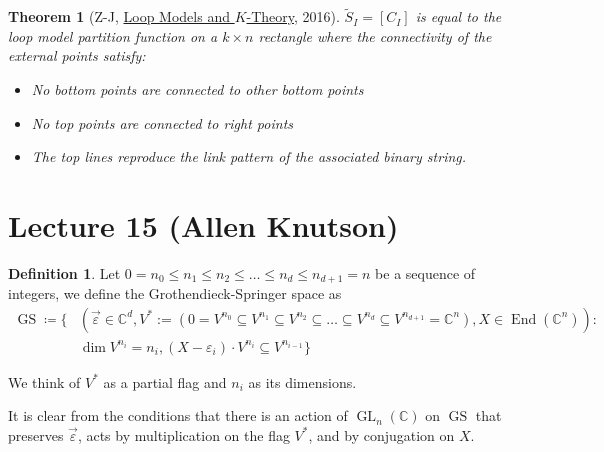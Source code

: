 \documentclass[12pt]{amsart}
\numberwithin{equation}{section}
\newtheorem{Theorem}[equation]{Theorem}
\theoremstyle{definition}
\newtheorem{Definition}[equation]{Definition}
\numberwithin{figure}{section}
\newcommand{\C}{\mathbb{C}}
\newcommand{\GL}{\operatorname{GL}}
\newcommand{\End}{\operatorname{End}}
\newcommand{\Stil}{\tilde{S}}
\newcommand{\GS}{\operatorname{GS}}
\begin{document}
\begin{Theorem}[Z-J, \href{https://doi.org/10.3842/SIGMA.2018.069}{Loop Models and $K$-Theory}, 2016]
	$\Stil_I = [C_I]$ is equal to the loop model partition function on a $k \times n$ rectangle where the connectivity of the external points satisfy:
	\begin{itemize}
		\item No bottom points are connected to other bottom points
		\item No top points are connected to right points
		\item The top lines reproduce the link pattern of the associated binary string.
	\end{itemize}
\end{Theorem}

\section{Lecture 15 (Allen Knutson)}

\begin{Definition}
	Let $0 = n_0 \leq n_1 \leq n_2 \leq \dots \leq n_d \leq n_{d+1} = n$ be a sequence of integers, we define the Grothendieck-Springer space as
	\begin{equation*}
		\begin{aligned}
			\GS \coloneqq \{
			 & (\overrightarrow{\varepsilon} \in \C^d, V^* := (0 = V^{n_0} \subseteq V^{n_1} \subseteq V^{n_2} \subseteq \dots \subseteq V^{n_d} \subseteq V^{n_{d+1}}  =\C^n), X \in \End(\C^n)): \\
			 & \dim V^{n_i} = n_i, (X - \varepsilon_i) \cdot V^{n_i} \subseteq V^{n_{i-1}} \}
		\end{aligned}
	\end{equation*}
\end{Definition}

We think of $V^*$ as a partial flag and $n_i$ as its dimensions.

It is clear from the conditions that there is an action of $\GL_n(\C)$ on $\GS$ that preserves $\overrightarrow{\varepsilon}$, acts by multiplication on the flag $V^*$, and by conjugation on $X$.
\end{document}
